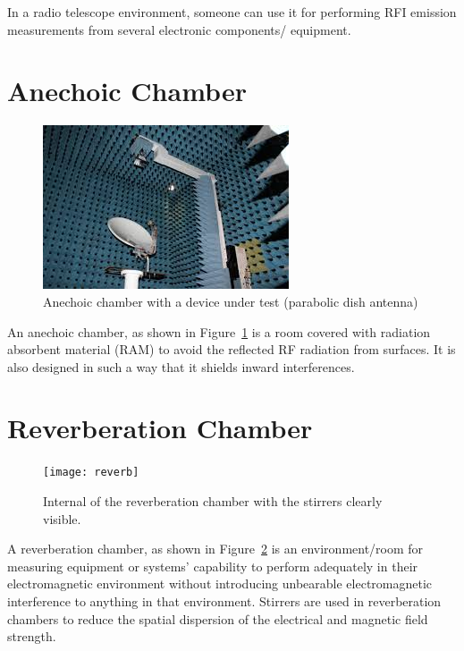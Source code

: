 \documentclass[12pt,a4paper]{report}
\begin{document}
{		In a radio telescope environment, someone can use it for performing RFI emission measurements from several electronic components/ equipment.
		
		\section*{Anechoic Chamber}
		
		\begin{figure}[h!]
			\centering
			\includegraphics[width=\linewidth]{anechoic}
			\caption{Anechoic chamber with a device under test (parabolic dish antenna)}
			\label{fig:anechoic}
		\end{figure}
		
		An anechoic chamber, as shown in Figure~\ref*{fig:anechoic} is a room covered with radiation absorbent material (RAM) to avoid the reflected RF radiation from surfaces. It is also designed in such a way that it shields inward interferences.
		
		\section*{Reverberation Chamber}
		
		\begin{figure}[h!]
			\centering
			\texttt{[image: reverb]}
			\caption{Internal of the reverberation chamber with the stirrers clearly visible.}
			\label{fig:reverb}
		\end{figure}
		
		
		A reverberation chamber, as shown in Figure~\ref*{fig:reverb} is an environment/room for measuring equipment or systems' capability to perform adequately in their electromagnetic environment without introducing unbearable electromagnetic interference to anything in that environment. Stirrers are used in reverberation chambers to reduce the spatial dispersion of the electrical and magnetic field strength.\\
		
}
\end{document}
